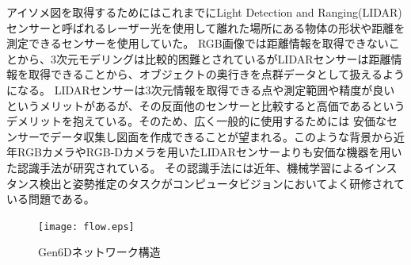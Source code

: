 アイソメ図を取得するためにはこれまでにLight Detection and Ranging(LIDAR)センサーと呼ばれるレーザー光を使用して離れた場所にある物体の形状や距離を測定できるセンサーを使用していた。
RGB画像では距離情報を取得できないことから、3次元モデリングは比較的困難とされているがLIDARセンサーは距離情報を取得できることから、オブジェクトの奥行きを点群データとして扱えるようになる。
LIDARセンサーは3次元情報を取得できる点や測定範囲や精度が良いというメリットがあるが、その反面他のセンサーと比較すると高価であるというデメリットを抱えている。そのため、広く一般的に使用するためには
安価なセンサーでデータ収集し図面を作成できることが望まれる。このような背景から近年RGBカメラやRGB-Dカメラを用いたLIDARセンサーよりも安価な機器を用いた認識手法が研究されている。
その認識手法には近年、機械学習によるインスタンス検出と姿勢推定のタスクがコンピュータビジョンにおいてよく研修されている問題である。
\begin{figure}[htbt]
	\centering
	 \texttt{[image: flow.eps]}
	 \caption{Gen6Dネットワーク構造}
	 \label{fig:f2}
\end{figure}

